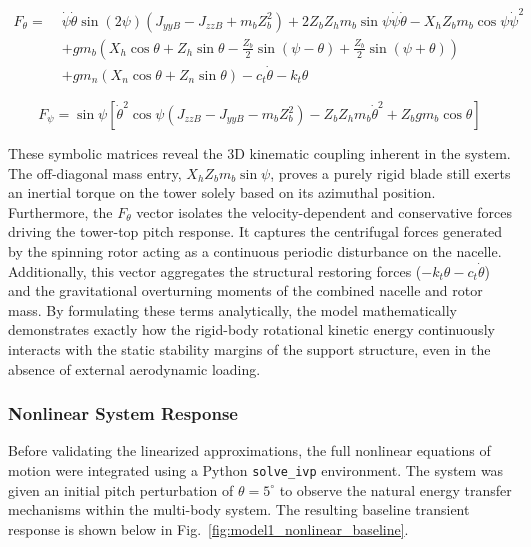\documentclass[final,onecolumn]{IEEEtran}
\begin{document}
\begin{equation*}
    \begin{split}
        F_{\theta} =\; & \dot{\psi}\dot{\theta}\sin{(2\psi)}(J_{yy B} - J_{zz B} + m_b Z_b^2) + 2 Z_b Z_h m_b \sin{\psi} \dot{\psi}\dot{\theta} - X_h Z_b m_b \cos{\psi} \dot{\psi}^2 \\
                       & + g m_b \left( X_h \cos{\theta} + Z_h \sin{\theta} - \frac{Z_b}{2}\sin{(\psi - \theta)} + \frac{Z_b}{2}\sin{(\psi + \theta)} \right)                         \\
                       & + g m_n (X_n \cos{\theta} + Z_n \sin{\theta}) - c_t \dot{\theta} - k_t \theta
    \end{split}
\end{equation*}

\begin{equation*}
    F_{\psi} = \sin{\psi} \left[ \dot{\theta}^2 \cos{\psi}(J_{zz B} - J_{yy B} - m_b Z_b^2) - Z_b Z_h m_b \dot{\theta}^2 + Z_b g m_b \cos{\theta} \right]
\end{equation*}

These symbolic matrices reveal the 3D kinematic coupling inherent in the system. The off-diagonal mass entry, $X_h Z_b m_b \sin{\psi}$, proves a purely rigid blade still exerts an inertial torque on the tower solely based on its azimuthal position. Furthermore, the $F_{\theta}$ vector isolates the velocity-dependent and conservative forces driving the tower-top pitch response. It captures the centrifugal forces generated by the spinning rotor acting as a continuous periodic disturbance on the nacelle. Additionally, this vector aggregates the structural restoring forces ($-k_t \theta - c_t \dot{\theta}$) and the gravitational overturning moments of the combined nacelle and rotor mass. By formulating these terms analytically, the model mathematically demonstrates exactly how the rigid-body rotational kinetic energy continuously interacts with the static stability margins of the support structure, even in the absence of external aerodynamic loading.

\subsubsection{Nonlinear System Response}
\label{sec:model1_nonlinear}

Before validating the linearized approximations, the full nonlinear equations of motion were integrated using a Python \texttt{solve\_ivp} environment. The system was given an initial pitch perturbation of $\theta = 5^\circ$ to observe the natural energy transfer mechanisms within the multi-body system. The resulting baseline transient response is shown below in Fig.~\ref{fig:model1_nonlinear_baseline}.
\end{document}
